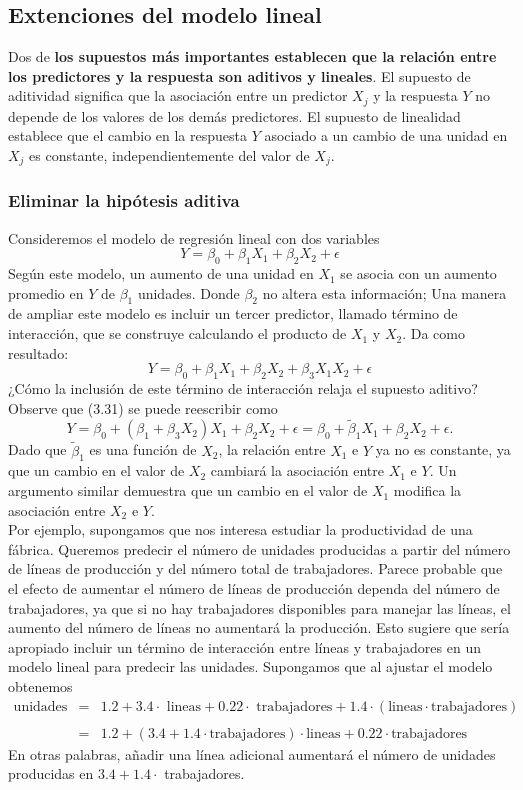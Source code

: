 \subsection{Extenciones del modelo lineal}
Dos de \textbf{los supuestos más importantes establecen que la relación entre los predictores y la respuesta son aditivos y lineales}. El supuesto de aditividad significa que la asociación entre un predictor $X_j$ y la respuesta $Y$ no depende de los valores de los demás predictores. El supuesto de linealidad establece que el cambio en la respuesta $Y$ asociado a un cambio de una unidad en $X_j$ es constante, independientemente del valor de $X_j$.

\subsubsection{Eliminar la hipótesis aditiva}
Consideremos el modelo de regresión lineal con dos variables
$$Y=\beta_0+\beta_1X_1+\beta_2X_2+\epsilon$$
Según este modelo, un aumento de una unidad en $X_1$ se asocia con un aumento promedio en $Y$ de $\beta_1$ unidades. Donde $\beta_2$ no altera esta información; Una manera de ampliar este modelo es incluir un tercer predictor, llamado término de interacción, que se construye calculando el producto de $X_1$ y $X_2$. Da como resultado:
$$Y=\beta_0+\beta_1X_1+\beta_2X_2+\beta_3X_1X_2+\epsilon$$
¿Cómo la inclusión de este término de interacción relaja el supuesto aditivo?
Observe que (3.31) se puede reescribir como
$$Y=\beta_0+(\beta_1+\beta_3X_2)X_1+\beta_2X_2+\epsilon=\beta_0+\tilde{\beta}_1X_1+\beta_2X_2+\epsilon.$$
Dado que $\tilde{\beta}_1$ es una función de $X_2$, la relación entre $X_1$ e $Y$ ya no es constante, ya que un cambio en el valor de $X_2$ cambiará la asociación entre $X_1$ e $Y$. Un argumento similar demuestra que un cambio en el valor de $X_1$ modifica la asociación entre $X_2$ e $Y$.\\
Por ejemplo, supongamos que nos interesa estudiar la productividad de una fábrica. Queremos predecir el número de unidades producidas a partir del número de líneas de producción y del número total de trabajadores. Parece probable que el efecto de aumentar el número de líneas de producción dependa del número de trabajadores, ya que si no hay trabajadores disponibles para manejar las líneas, el aumento del número de líneas no aumentará la producción. Esto sugiere que sería apropiado incluir un término de interacción entre líneas y trabajadores en un modelo lineal para predecir las unidades. Supongamos que al ajustar el modelo obtenemos
$$
\begin{array}{rcl}
    \mbox{unidades} &=& 1.2+3.4\cdot \mbox{ lineas} + 0.22\cdot \mbox{ trabajadores}+1.4\cdot (\mbox{lineas}\cdot \mbox{trabajadores})\\\\
		    &=& 1.2+(3.4+1.4\cdot \mbox{trabajadores})\cdot \mbox{lineas}+0.22\cdot \mbox{trabajadores}
\end{array}
$$
En otras palabras, añadir una línea adicional aumentará el número de unidades producidas en $3.4 + 1.4 \cdot$ trabajadores.\\

